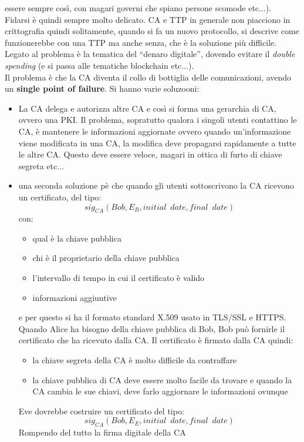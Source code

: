 \documentclass[a4paper,12pt, oneside]{book}
\begin{document}
essere sempre così, con magari governi che spiano persone scomode
etc$\ldots$). \\ 
Fidarsi è quindi sempre molto delicato. CA e TTP in generale non piacciono in
crittografia quindi solitamente, quando si fa un nuovo protocollo, si descrive
come funzionerebbe con una TTP ma anche senza, che è la soluzione più
difficile. Legato al problema è la tematica del ``denaro digitale'', dovendo
evitare il \textit{double spending} (e si passa alle tematiche blockchain
etc$\ldots$).\\   
Il problema è che la CA diventa il collo di bottiglia delle comunicazioni,
avendo un \textbf{single point of failure}. Si hanno varie soluzooni:
\begin{itemize}
  \item La CA delega e autorizza altre CA e così si forma una gerarchia di CA,
  ovvero una PKI. Il problema, sopratutto qualora i singoli utenti contattino le
  CA, è mantenere le informazioni aggiornate ovvero quando
  un'informazione viene modificata in una CA, la modifica deve propagarsi
  rapidamente a tutte le altre CA. Questo deve essere veloce, magari in ottica
  di furto di chiave segreta etc$\ldots$
  \item una seconda soluzione pè che quando gli utenti sottoscrivono la CA
  ricevono un certificato, del tipo:
  \[sig_{CA}(Bob, E_B, initial\,\,\, date, final\,\,\, date)\]
  con:
  \begin{itemize}
    \item qual è la chiave pubblica
    \item chi è il proprietario della chiave pubblica
    \item l'intervallo di tempo in cui il certificato è valido 
    \item informazioni aggiuntive
  \end{itemize}
  e per questo si ha il formato standard X.509 usato in TLS/SSL e HTTPS. Quando
  Alice ha bisogno della chiave pubblica di Bob, Bob può fornirle il certificato
  che ha ricevuto dalla CA. Il certificato è firmato dalla CA quindi:
  \begin{itemize}
    \item la chiave segreta della CA è molto difficile da contraffare
    \item la chiave pubblica di CA deve essere molto facile da trovare e quando
    la CA cambia le sue chiavi, deve farlo aggiornare le informazioni ovunque  
  \end{itemize}
  Eve dovrebbe costruire un certificato del tipo:
  \[sig_{CA}(Bob, E_E, initial\,\,\, date, final\,\,\, date)\]
  Rompendo del tutto la firma digitale della CA
\end{itemize}
\end{document}
